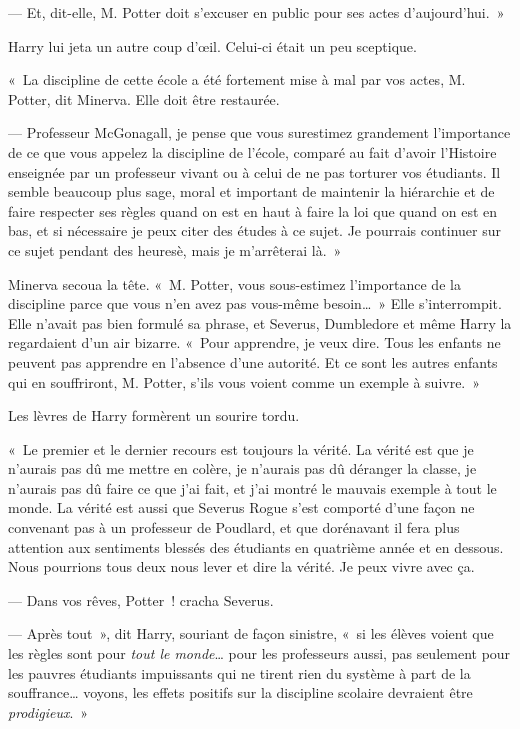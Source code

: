 --- Et, dit-elle, M. Potter doit s'excuser en public pour ses actes d'aujourd'hui.~»

Harry lui jeta un autre coup d'œil. Celui-ci était un peu sceptique.

«~La discipline de cette école a été fortement mise à mal par vos actes, M. Potter, dit Minerva. Elle doit être restaurée.

--- Professeur McGonagall, je pense que vous surestimez grandement l'importance de ce que vous appelez la discipline de l'école, comparé au fait d'avoir l'Histoire enseignée par un professeur vivant ou à celui de ne pas torturer vos étudiants. Il semble beaucoup plus sage, moral et important de maintenir la hiérarchie et de faire respecter ses règles quand on est en haut à faire la loi que quand on est en bas, et si nécessaire je peux citer des études à ce sujet. Je pourrais continuer sur ce sujet pendant des heuresè, mais je m'arrêterai là.~»

Minerva secoua la tête. «~M. Potter, vous sous-estimez l'importance de la discipline parce que vous n'en avez pas vous-même besoin…~» Elle s'interrompit. Elle n'avait pas bien formulé sa phrase, et Severus, Dumbledore et même Harry la regardaient d'un air bizarre. «~Pour apprendre, je veux dire. Tous les enfants ne peuvent pas apprendre en l'absence d'une autorité. Et ce sont les autres enfants qui en souffriront, M. Potter, s'ils vous voient comme un exemple à suivre.~»

Les lèvres de Harry formèrent un sourire tordu.

«~Le premier et le dernier recours est toujours la vérité. La vérité est que je n'aurais pas dû me mettre en colère, je n'aurais pas dû déranger la classe, je n'aurais pas dû faire ce que j'ai fait, et j'ai montré le mauvais exemple à tout le monde. La vérité est aussi que Severus Rogue s'est comporté d'une façon ne convenant pas à un professeur de Poudlard, et que dorénavant il fera plus attention aux sentiments blessés des étudiants en quatrième année et en dessous. Nous pourrions tous deux nous lever et dire la vérité. Je peux vivre avec ça.

--- Dans vos rêves, Potter~! cracha Severus.

--- Après tout~», dit Harry, souriant de façon sinistre, «~si les élèves voient que les règles sont pour \emph{tout le monde}… pour les professeurs aussi, pas seulement pour les pauvres étudiants impuissants qui ne tirent rien du système à part de la souffrance… voyons, les effets positifs sur la discipline scolaire devraient être \emph{prodigieux}.~»

